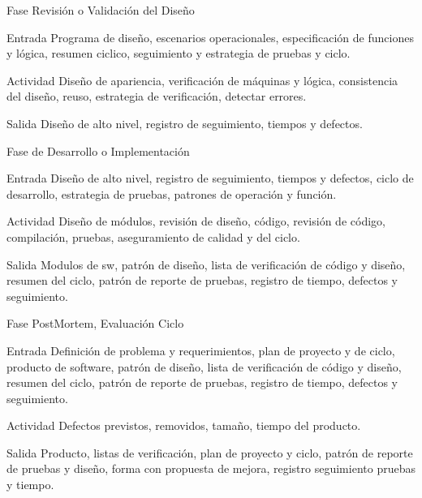 \documentclass[]{beamer}
\begin{document}
			\begin{frame}{Fase Revisión o Validación del Diseño}
				\begin{block}{Entrada}
					Programa de diseño, escenarios operacionales, especificación de funciones y lógica, resumen ciclico, seguimiento y estrategia de pruebas y ciclo.
				\end{block}
				\begin{block}{Actividad}
					Diseño de apariencia, verificación de máquinas y lógica, consistencia del diseño, reuso, estrategia de verificación, detectar errores.
				\end{block}
				\begin{block}{Salida}
					Diseño de alto nivel, registro de seguimiento, tiempos y defectos.
				\end{block}
			\end{frame}
			
			\begin{frame}{Fase de Desarrollo o Implementación}
				\begin{block}{Entrada}
					Diseño de alto nivel, registro de seguimiento, tiempos y defectos, ciclo de desarrollo, estrategia de pruebas, patrones de operación y función.
				\end{block}
				\begin{block}{Actividad}
					Diseño de módulos, revisión de diseño, código, revisión de código, compilación, pruebas, aseguramiento de calidad y del ciclo.
				\end{block}
				\begin{block}{Salida}
					Modulos de sw, patrón de diseño, lista de verificación de código y diseño, resumen del ciclo, patrón de reporte de pruebas, registro de tiempo, defectos y seguimiento.
				\end{block}
			\end{frame}			
			
			\begin{frame}{Fase PostMortem, Evaluación Ciclo}
				\begin{block}{Entrada}
					Definición de problema y requerimientos, plan de proyecto y de ciclo, producto de software, patrón de diseño, lista de verificación de código y diseño, resumen del ciclo, patrón de reporte de pruebas, registro de tiempo, defectos y seguimiento.
				\end{block}
				\begin{block}{Actividad}
					Defectos previstos, removidos, tamaño, tiempo del producto.
				\end{block}
				\begin{block}{Salida}
					Producto, listas de verificación, plan de proyecto y ciclo, patrón de reporte de pruebas y diseño, forma con propuesta de mejora, registro seguimiento pruebas y tiempo.
				\end{block}
			\end{frame}				
					
\end{document}
